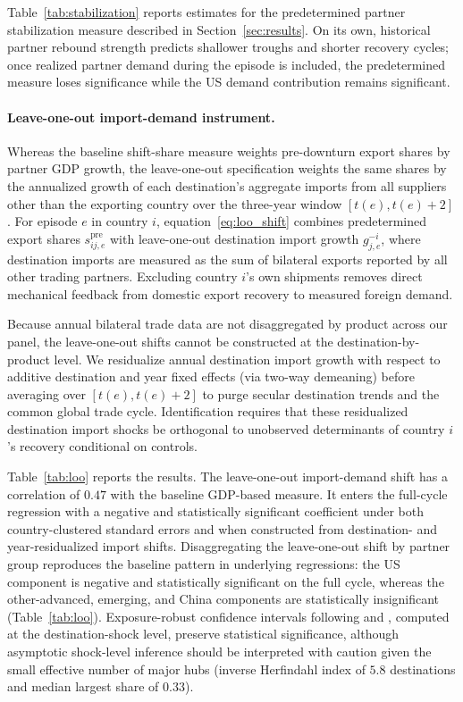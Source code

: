 \documentclass[12pt, a4paper]{article}
\begin{document}


Table~\ref{tab:stabilization} reports estimates for the predetermined partner stabilization measure described in Section~\ref{sec:results}. On its own, historical partner rebound strength predicts shallower troughs and shorter recovery cycles; once realized partner demand during the episode is included, the predetermined measure loses significance while the US demand contribution remains significant.



\paragraph{Leave-one-out import-demand instrument.}
Whereas the baseline shift-share measure weights pre-downturn export shares by partner GDP growth, the leave-one-out specification weights the same shares by the annualized growth of each destination's aggregate imports from all suppliers other than the exporting country over the three-year window $[t(e),t(e)+2]$. For episode $e$ in country $i$, equation~\eqref{eq:loo_shift} combines predetermined export shares $s_{ij,e}^{\text{pre}}$ with leave-one-out destination import growth $g_{j,e}^{-i}$, where destination imports are measured as the sum of bilateral exports reported by all other trading partners. Excluding country $i$'s own shipments removes direct mechanical feedback from domestic export recovery to measured foreign demand.

Because annual bilateral trade data are not disaggregated by product across our panel, the leave-one-out shifts cannot be constructed at the destination-by-product level. We residualize annual destination import growth with respect to additive destination and year fixed effects (via two-way demeaning) before averaging over $[t(e),t(e)+2]$ to purge secular destination trends and the common global trade cycle. Identification requires that these residualized destination import shocks be orthogonal to unobserved determinants of country $i$'s recovery conditional on controls.

Table~\ref{tab:loo} reports the results. The leave-one-out import-demand shift has a correlation of $0.47$ with the baseline GDP-based measure. It enters the full-cycle regression with a negative and statistically significant coefficient under both country-clustered standard errors and when constructed from destination- and year-residualized import shifts. Disaggregating the leave-one-out shift by partner group reproduces the baseline pattern in underlying regressions: the US component is negative and statistically significant on the full cycle, whereas the other-advanced, emerging, and China components are statistically insignificant (Table~\ref{tab:loo}). Exposure-robust confidence intervals following \citet{adao2019} and \citet{borusyak2022}, computed at the destination-shock level, preserve statistical significance, although asymptotic shock-level inference should be interpreted with caution given the small effective number of major hubs (inverse Herfindahl index of $5.8$ destinations and median largest share of $0.33$).
\end{document}

